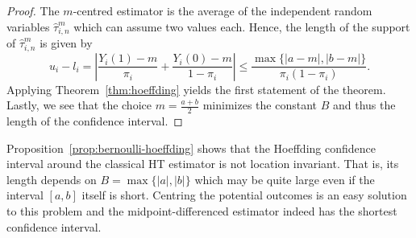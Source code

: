 \documentclass[aos]{imsart2}
\theoremstyle{plain}
\theoremstyle{definition}
\newcommand{\E}{\mathbb{E}}
\newcommand{\tauh}{\hat{\tau}}
\begin{document}
\begin{proof} The $m$-centred estimator is the average of the independent random variables $\tauh^m_{i,n}$
which can assume two values each. Hence, the length of the support of $\tauh^m_{i,n}$ is given by
\begin{equation*}
    u_i-l_i
        = \left\vert\frac{Y_i(1)-m}{\pi_i}+\frac{Y_i(0)-m}{1-\pi_i} \right\vert
        \leq \frac{\max\{\lvert a -m \rvert, \lvert b-m\rvert\}}{\pi_i(1-\pi_i)}.
\end{equation*}
    Applying Theorem~\ref{thm:hoeffding} yields the first statement of the theorem. Lastly, we see that the choice $m=\frac{a+b}{2}$ minimizes the constant $B$ and thus the length of the confidence interval.
\end{proof}

Proposition~\ref{prop:bernoulli-hoeffding} shows that the Hoeffding confidence interval around the classical HT estimator is not location invariant. That is, its length depends on $B=\max\{\lvert a\rvert, \lvert b\rvert\}$ which may be quite large even if the interval $[a,b]$ itself is short. Centring the potential outcomes is an easy solution to this problem and the midpoint-differenced estimator indeed has the shortest confidence interval.
\end{document}
